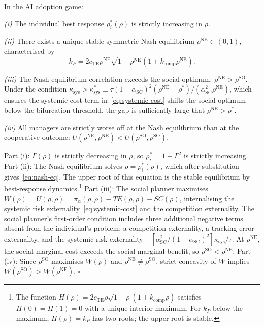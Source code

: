 \begin{proposition}\label{prop:endogenous-rho}
  In the AI adoption game:

  \emph{(i)} The individual best response $\rho_i^*(\bar{\rho})$ is strictly increasing in $\bar{\rho}$.

  \emph{(ii)} There exists a unique stable symmetric Nash equilibrium $\rho^{\text{NE}} \in (0,1)$, characterised by
  \begin{equation}\label{eq:nash-eq}
    k_P = 2 c_{\text{TE}} \rho^{\text{NE}} \sqrt{1-\rho^{\text{NE}}} (1 + k_{\text{comp}} \rho^{\text{NE}}).
  \end{equation}

  \emph{(iii)} The Nash equilibrium correlation exceeds the social optimum: $\rho^{\text{NE}} > \rho^{\text{SO}}$. Under the condition $\kappa_{\text{sys}} > \kappa_{\text{sys}}^* \equiv \tau(1-\alpha_{\text{SC}})^2(\rho^{\text{NE}} - \rho^*)/(\alpha_{\text{SC}}^2 \rho^{\text{NE}})$, which ensures the systemic cost term in~\eqref{eq:systemic-cost} shifts the social optimum below the bifurcation threshold, the gap is sufficiently large that $\rho^{\text{NE}} > \rho^*$.

  \emph{(iv)} All managers are strictly worse off at the Nash equilibrium than at the cooperative outcome: $U(\rho^{\text{NE}}, \rho^{\text{NE}}) < U(\rho^{\text{SO}}, \rho^{\text{SO}})$.

   Part (i): $\Gamma(\bar{\rho})$ is strictly decreasing in $\bar{\rho}$, so $\rho_i^* = 1-\Gamma^2$ is strictly increasing. Part (ii): The Nash equilibrium solves $\rho = \rho_i^*(\rho)$, which after substitution gives~\eqref{eq:nash-eq}. The upper root of this equation is the stable equilibrium by best-response dynamics.\footnote{The function $H(\rho) = 2 c_{\text{TE}} \rho \sqrt{1-\rho}(1+k_{\text{comp}}\rho)$ satisfies $H(0) = H(1) = 0$ with a unique interior maximum. For $k_P$ below the maximum, $H(\rho) = k_P$ has two roots; the upper root is stable.} Part (iii): The social planner maximises $W(\rho) = U(\rho, \rho) = \pi_\alpha(\rho, \rho) - TE(\rho, \rho) - SC(\rho)$, internalising the systemic risk externality~\eqref{eq:systemic-cost} and the competition externality. The social planner's first-order condition includes three additional negative terms absent from the individual's problem: a competition externality, a tracking error externality, and the systemic risk externality $-[\alpha_{\text{SC}}^2/(1-\alpha_{\text{SC}})^2]\kappa_{\text{sys}}/\tau$. At $\rho^{\text{NE}}$, the social marginal cost exceeds the social marginal benefit, so $\rho^{\text{SO}} < \rho^{\text{NE}}$. Part (iv): Since $\rho^{\text{SO}}$ maximises $W(\rho)$ and $\rho^{\text{NE}} \neq \rho^{\text{SO}}$, strict concavity of $W$ implies $W(\rho^{\text{SO}}) > W(\rho^{\text{NE}})$. $\square$
\end{proposition}

